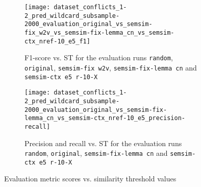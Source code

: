 \documentclass[11pt]{scrreprt}
\begin{document}
\begin{figure}
 \centering
 \begin{subfigure}{\textwidth}
	\texttt{[image: dataset\_conflicts\_1-2\_pred\_wildcard\_subsample-2000\_evaluation\_original\_vs\_semsim-fix\_w2v\_vs\_semsim-fix-lemma\_cn\_vs\_semsim-ctx\_nref-10\_e5\_f1]}
	\caption{F1-score vs. ST for the evaluation runs \texttt{random}, \texttt{original}, \texttt{semsim-fix w2v}, \texttt{semsim-fix-lemma cn} and \texttt{semsim-ctx e5 r-10-X}}
	\label{fig:best-f1-per-pattern}
 \end{subfigure}
 \newline
 \newline
 \begin{subfigure}{\textwidth}
	\texttt{[image: dataset\_conflicts\_1-2\_pred\_wildcard\_subsample-2000\_evaluation\_original\_vs\_semsim-fix-lemma\_cn\_vs\_semsim-ctx\_nref-10\_e5\_precision-recall]}
	\caption{Precision and  recall vs. ST for the evaluation runs \texttt{random}, \texttt{original}, \texttt{semsim-fix-lemma cn} and \texttt{semsim-ctx e5 r-10-X}}
	\label{fig:prec-rec-best-semsim}
 \end{subfigure}
 \caption{Evaluation metric scores vs. similarity threshold values}
\end{figure}
 
%


\end{document}
